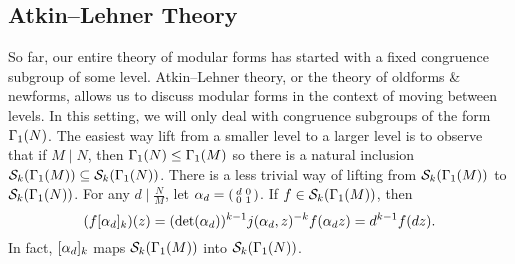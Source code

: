     \subsection*{Atkin–Lehner Theory}
      So far, our entire theory of modular forms has started with a fixed congruence subgroup of some level. Atkin–Lehner theory, or the theory of oldforms \& newforms, allows us to discuss modular forms in the context of moving between levels. In this setting, we will only deal with congruence subgroups of the form $\Gamma_{1}(N)$. The easiest way lift from a smaller level to a larger level is to observe that if $M \mid N$, then $\Gamma_{1}(N) \le \Gamma_{1}(M)$ so there is a natural inclusion $\mathcal{S}_{k}(\Gamma_{1}(M)) \subseteq \mathcal{S}_{k}(\Gamma_{1}(N))$. There is a less trivial way of lifting from $\mathcal{S}_{k}(\Gamma_{1}(M))$ to $\mathcal{S}_{k}(\Gamma_{1}(N))$. For any $d \mid \frac{N}{M}$, let $\alpha_{d} = \begin{psmallmatrix} d & 0 \\ 0 & 1 \end{psmallmatrix}$. If $f \in \mathcal{S}_{k}(\Gamma_{1}(M))$, then
      \[
          (f[\alpha_{d}]_{k})(z) = (\det(\alpha_{d}))^{k-1}j(\alpha_{d},z)^{-k}f(\alpha_{d} z) = d^{k-1}f(dz).
      \]
      In fact, $[\alpha_{d}]_{k}$ maps $\mathcal{S}_{k}(\Gamma_{1}(M))$ into $\mathcal{S}_{k}(\Gamma_{1}(N))$.
      

